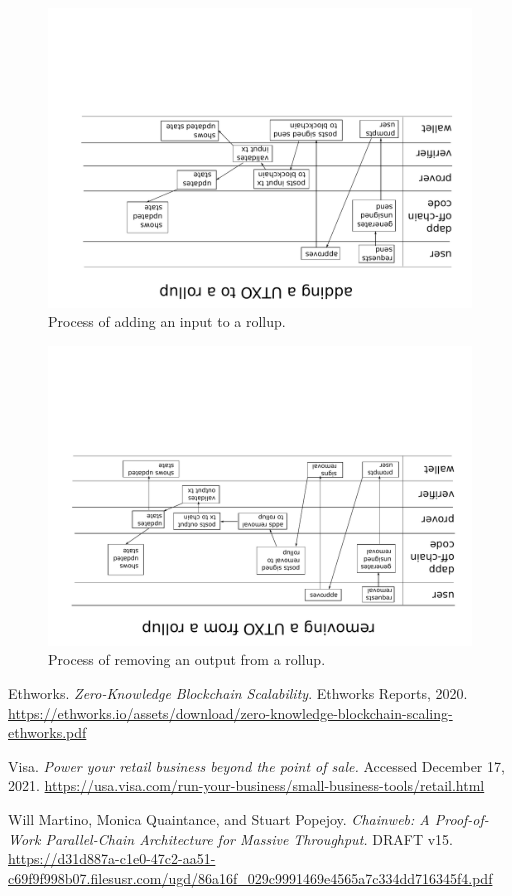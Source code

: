 \documentclass[12pt]{article}
\begin{document}
\begin{figure}
	\includegraphics[angle=180,width=1.0\columnwidth]{process-diagram-b.pdf}
	\caption{Process of adding an input to a rollup.}
	\label{fig:process-b}
\end{figure}

\begin{figure}
	\includegraphics[angle=180,width=1.0\columnwidth]{process-diagram-c.pdf}
	\caption{Process of removing an output from a rollup.}
	\label{fig:process-c}
\end{figure}


\clearpage


\begin{thebibliography}{3}


		Ethworks. \textit{Zero-Knowledge Blockchain Scalability}. Ethworks Reports, 2020. \url{https://ethworks.io/assets/download/zero-knowledge-blockchain-scaling-ethworks.pdf}

		Visa. \textit{Power your retail business beyond the point of sale.} Accessed December 17, 2021. \url{https://usa.visa.com/run-your-business/small-business-tools/retail.html}

		Will Martino, Monica Quaintance, and Stuart Popejoy. \textit{Chainweb: A Proof-of-Work Parallel-Chain Architecture for Massive Throughput.} DRAFT v15. \url{https://d31d887a-c1e0-47c2-aa51-c69f9f998b07.filesusr.com/ugd/86a16f_029c9991469e4565a7c334dd716345f4.pdf}


\end{thebibliography}
\end{document}
